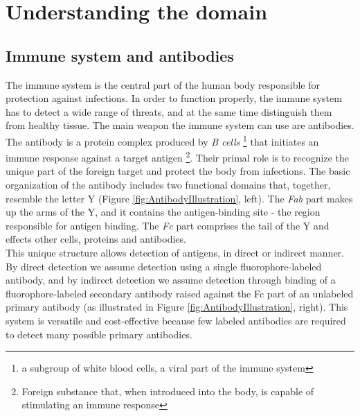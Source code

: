 
\chapter{Understanding the domain} 

\label{Chapter2} %




\section{Immune system and antibodies }

The immune system is the central part of the human body responsible for protection against infections. In order to function properly, the immune system has to detect a wide range of threats, and at the same time distinguish them from  healthy tissue. The main weapon the immune system can use are antibodies.   \\

The antibody is a protein complex produced by \textit{B cells} \footnote{ a subgroup of white blood cells, a viral part of the immune system} that initiates an immune response against a target antigen \footnote{Foreign substance that, when introduced into the body, is capable of stimulating an immune response}. Their primal role is to recognize the unique part of the foreign target and  protect the body from infections. The basic organization of the antibody includes two functional domains that, together, resemble the letter Y (Figure \ref{fig:AntibodyIllustration}, left). The \textit{Fab}  part makes up the arms of the Y, and it contains the antigen-binding site - the region responsible for antigen binding. The \textit{Fc} part comprises the tail of the Y and effects other cells, proteins and antibodies.  \\

This unique structure allows detection of antigens, in direct or indirect manner. By direct detection we assume detection using a single fluorophore-labeled antibody, and by indirect detection we assume detection through binding of a fluorophore-labeled secondary antibody raised against the Fc part of an unlabeled primary antibody (as illustrated in Figure \ref{fig:AntibodyIllustration}, right). This system is versatile and cost-effective because few labeled antibodies are required to detect many possible primary antibodies. \\



